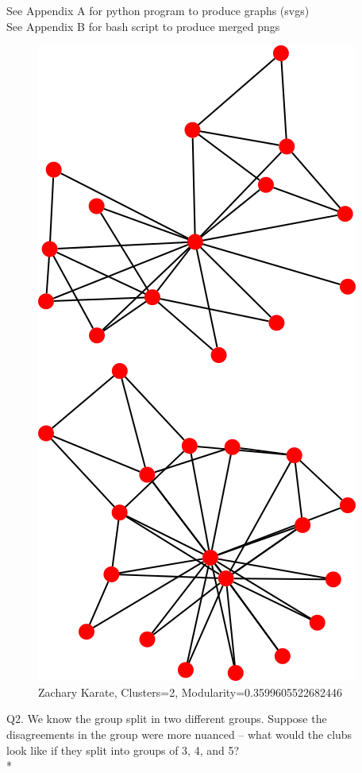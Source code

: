 \documentclass{article}
\begin{document}
See Appendix A for python program to produce graphs (svgs)\\
See Appendix B for bash script to produce merged pngs\\
\begin{figure}[H]
  \centering
  \caption{Zachary Karate, Clusters=2, Modularity=0.3599605522682446}
  \includegraphics[scale=.32]{2-karate.png}
\end{figure}
\clearpage

\newpage
Q2. We know the group split in two different groups.  Suppose the\\
disagreements in the group were more nuanced -- what would the clubs\\
look like if they split into groups of 3, 4, and 5?\\*
\end{document}
